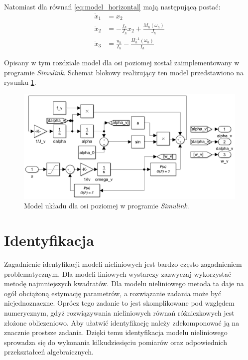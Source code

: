 \documentclass[11pt,a4paper]{article}
\begin{document}
Natomiast dla równań \eqref{eq:model_horizontal} mają następującą postać:
\begin{equation}
\begin{aligned}
\dot x_1 &= x_2\\
\dot x_2 &= -\frac{f_h}{J_h}x_2+\frac{M_h(\omega_h)}{J_h}\\
\dot x_3 &= \frac{u_h}{I_h}-\frac{H_h^{-1}(\omega_h)}{I_h}
\end{aligned}
\end{equation}

Opisany w tym rozdziale model dla osi poziomej został zaimplementowany w programie \textit{Simulink}. Schemat blokowy realizujący ten model przedstawiono na rysunku \ref{fig:Model_vertical}.

\begin{figure}[H]
	\centering
	\includegraphics[width=5.9in]{Figures/Model_vertical.png}
	\caption{Model układu dla osi poziomej w programie \textit{Simulink}.}
	\label{fig:Model_vertical}
\end{figure}

\section{Identyfikacja}
\label{sec:identyfikacja}
Zagadnienie identyfikacji modeli nieliniowych jest bardzo często zagadnieniem problematycznym. Dla modeli liniowych wystarczy zazwyczaj wykorzystać metodę najmniejszych kwadratów. Dla modelu nieliniowego metoda ta daje na ogół obciążoną estymację parametrów, a rozwiązanie zadania może być niejednoznaczne. Oprócz tego zadanie to jest skomplikowane pod względem numerycznym, gdyż rozwiązywania nieliniowych równań różniczkowych jest złożone obliczeniowo. Aby ułatwić identyfikację należy zdekomponować ją na znacznie prostsze zadania. Dzięki temu identyfikacja modelu nieliniowego sprowadza się do wykonania kilkudziesięciu pomiarów oraz odpowiednich przekształceń algebraicznych.
\end{document}
